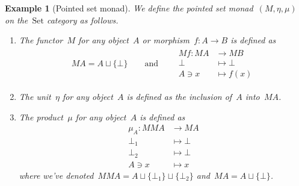 \documentclass[a4paper]{article}
\theoremstyle{plain}
\newtheorem{example}[theorem]{Example}
\theoremstyle{definition}
\newcommand{\Set}{\mathrm{Set}}
\begin{document}
\begin{example}[Pointed set monad]
    \label{monad:maybe}
    We define the pointed set monad~\((M,\eta,\mu)\) on the~\(\Set\) category as
    follows.
    \begin{enumerate}
        \item The functor~\(M\) for any object~\(A\) or
            morphism~\(f:A\longrightarrow B\) is defined as
            \begin{gather*}
                MA = A\sqcup\{\bot\}
                \qquad\text{and}\qquad
                \begin{split}
                    Mf:MA&\longrightarrow MB \\
                    \bot&\longmapsto\bot \\
                    A\ni x&\longmapsto f(x)
                \end{split}
            \end{gather*}
        \item The unit~\(\eta\) for any object~\(A\) is defined as the inclusion
            of~\(A\) into~\(MA\).
        \item The product~\(\mu\) for any object~\(A\) is defined as
            \begin{align*}
                \mu_{A}:MMA&\longrightarrow MA \\
                \bot_{1}&\longmapsto \bot \\
                \bot_{2}&\longmapsto \bot \\
                A\ni x&\longmapsto x
            \end{align*}
            where we've denoted~\(MMA=A\sqcup\{\bot_{1}\}\sqcup\{\bot_{2}\}\)
            and~\(MA=A\sqcup\{\bot\}\).
    \end{enumerate}
\end{example}
\end{document}

